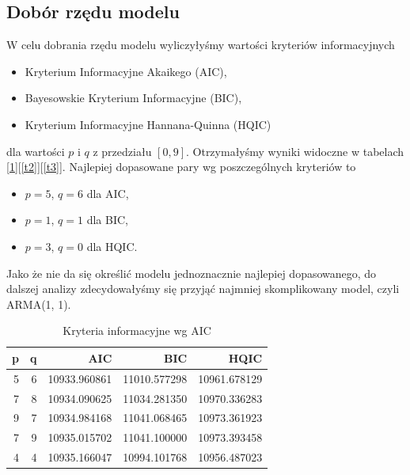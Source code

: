 \documentclass{article}
\theoremstyle{break}
\begin{document}
	\subsection{Dobór rzędu modelu}
	W celu dobrania rzędu modelu wyliczyłyśmy wartości kryteriów informacyjnych
	\begin{itemize}
		\item Kryterium Informacyjne Akaikego (AIC),
		\item Bayesowskie Kryterium Informacyjne (BIC),
		\item Kryterium Informacyjne Hannana-Quinna (HQIC)
	\end{itemize}
	
	dla wartości $p$ i $q$ z przedziału $[0,9]$. Otrzymałyśmy wyniki widoczne w tabelach [\ref{t1}][\ref{t2}][\ref{t3}]. Najlepiej dopasowane pary wg poszczególnych kryteriów to
	
	\begin{itemize}
		\item $p=5$, $q=6$ dla AIC,
		\item $p=1$, $q=1$ dla BIC,
		\item $p=3$, $q=0$ dla HQIC.
	\end{itemize}
	
	Jako że nie da się określić modelu jednoznacznie najlepiej dopasowanego, do dalszej analizy zdecydowałyśmy się przyjąć najmniej skomplikowany model, czyli ARMA(1, 1).
	
	\begin{table}[H]
		\centering
		\begin{tabular}{|r|r|r|r|r|}
			\hline
			\rowcolor[HTML]{C0C0C0} 
			{\color[HTML]{343434} \textbf{p}} & {\color[HTML]{343434} \textbf{q}} & {\color[HTML]{343434} \textbf{AIC}} & {\color[HTML]{343434} \textbf{BIC}} & {\color[HTML]{343434} \textbf{HQIC}} \\ \hline
			{\color[HTML]{343434} 5}          & {\color[HTML]{343434} 6}          & {\color[HTML]{343434} 10933.960861} & {\color[HTML]{343434} 11010.577298} & {\color[HTML]{343434} 10961.678129}  \\ \hline
			{\color[HTML]{343434} 7}          & {\color[HTML]{343434} 8}          & {\color[HTML]{343434} 10934.090625} & {\color[HTML]{343434} 11034.281350} & {\color[HTML]{343434} 10970.336283}  \\ \hline
			{\color[HTML]{343434} 9}          & {\color[HTML]{343434} 7}          & {\color[HTML]{343434} 10934.984168} & {\color[HTML]{343434} 11041.068465} & {\color[HTML]{343434} 10973.361923}  \\ \hline
			{\color[HTML]{343434} 7}          & {\color[HTML]{343434} 9}          & {\color[HTML]{343434} 10935.015702} & {\color[HTML]{343434} 11041.100000} & {\color[HTML]{343434} 10973.393458}  \\ \hline
			{\color[HTML]{343434} 4}          & {\color[HTML]{343434} 4}          & {\color[HTML]{343434} 10935.166047} & {\color[HTML]{343434} 10994.101768} & {\color[HTML]{343434} 10956.487023}  \\ \hline
		\end{tabular}
		\caption{Kryteria informacyjne wg AIC}
		\label{t1}
	\end{table}
	
\end{document}
